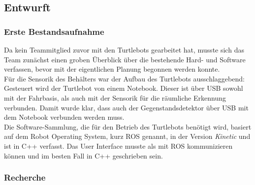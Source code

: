 \documentclass[a4paper,12pt,headsepline]{scrartcl}
\begin{document}
\subsection{Entwurft}
\subsubsection{Erste Bestandsaufnahme}
Da kein Teammitglied zuvor mit den Turtlebots gearbeitet hat, musste sich das Team zunächst einen groben Überblick über die bestehende Hard- und Software verfassen, bevor mit der eigentlichen Planung begonnen werden konnte.\\
Für die Sensorik des Behälters war der Aufbau des Turtlebots ausschlaggebend: Gesteuert wird der Turtlebot von einem Notebook. Dieser ist über USB sowohl mit der Fahrbasis, als auch mit der Sensorik für die räumliche Erkennung verbunden. Damit wurde klar, dass auch der Gegenstandsdetektor über USB mit dem Notebook verbunden werden muss. \\
Die Software-Sammlung, die für den Betrieb des Turtlebots benötigt wird, basiert auf dem \glqq Robot Operating System\grqq , kurz ROS genannt, in der Version \textit{Kinetic} und ist in C++ verfasst. Das User Interface musste als mit ROS kommunizieren können und im besten Fall in C++ geschrieben sein.

\subsubsection{Recherche}
\end{document}
